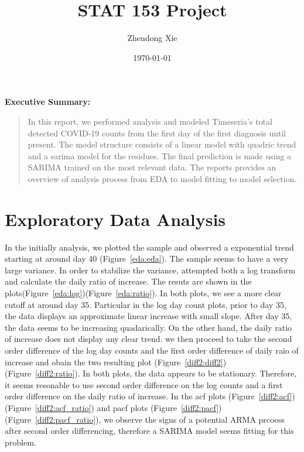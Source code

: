 \documentclass[a4paper]{article}
\title{STAT 153 Project}
\author{Zhendong Xie}
\date{\today}
\begin{document}
\maketitle




\noindent\textbf{Executive Summary:}

\begin{quote}
In this report, we performed analysis and modeled Timeseria's total
detected COVID-19 counts from the first day of the first diagnosis until present.
The model structure consists of a linear model with quadric trend and a sarima
model for the residues. The final prediction is made using a SARIMA trained on
the most relevant data. The reports provides an overview of analysis process
from EDA to model fitting to model selection.
\end{quote}


\section{Exploratory Data Analysis}
In the initially analysis, we plotted the sample and observed a exponential trend
starting at around day 40 (Figure~\ref{eda:eda}). The sample seems to have a very
large variance. In order to stabilize the variance,  attempted both a log transform
and calculate the daily ratio of increase. The resuts are shown in the
plots(Figure~\ref{eda:log})(Figure~\ref{eda:ratio}). In both plots, we see a
more clear cutoff at around day 35. Particular in the log day count plots, prior
to day 35, the data displays an approximate linear increase with small slope.
After day 35, the data seems to be increasing quadarically. On the other hand,
the daily ratio of increase does not display any clear trend. we then proceed to
take the second order difference of the log day counts and the first order
difference of daily raio of increase and obain the two resulting
plot (Figure~\ref{diff2:diff2})(Figure~\ref{diff2:ratio}). In both plots,
the data appears to be stationary. Therefore, it seems resonable to use second
order difference on the log counts and a first order difference on the daily
ratio of increase. In the acf
plots (Figure~\ref{diff2:acf})(Figure~\ref{diff2:acf_ratio}) and
pacf plots (Figure~\ref{diff2:pacf})(Figure~\ref{diff2:pacf_ratio}),
we observe the signs of a potential ARMA prcoess after second order differencing,
therefore a SARIMA model seems fitting for this problem.
\end{document}
